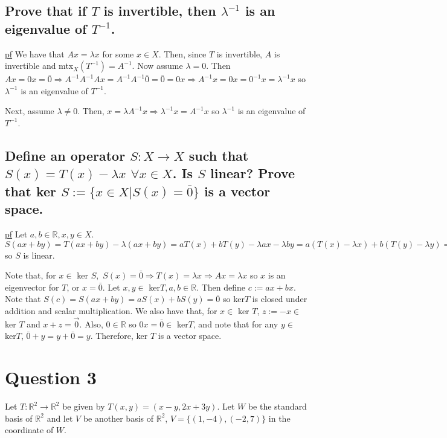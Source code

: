 \documentclass[11pt]{article} %
\begin{document}
\subsection{Prove that if $T$ is invertible, then $\lambda^{-1}$ is an eigenvalue of $T^{-1}$.}
\underline{pf} We have that $Ax = \lambda x$ for some $x \in X$. Then, since $T$ is invertible, $A$ is invertible and mtx$_X(T^{-1}) = A^{-1}.$ Now assume $\lambda = 0$. Then $Ax = 0x = \bar{0} \Rightarrow A^{-1} A^{-1} A x = A^{-1} A^{-1} \bar{0} = \bar{0} = 0x \Rightarrow A^{-1}x = 0 x = 0^{-1} x = \lambda^{-1} x$ so $\lambda^{-1}$ is an eigenvalue of $T^{-1}.$ 

Next, assume $\lambda \neq 0.$ Then, $x = \lambda A^{-1}x \Rightarrow \lambda^{-1} x = A^{-1}x$ so $\lambda^{-1}$ is an eigenvalue of $T^{-1}$.

\subsection{Define an operator $S: X \rightarrow X$ such that $S(x) = T(x) - \lambda x$ $\forall x \in X$. Is $S$ linear? Prove that ker $S:= \{ x \in X | S(x) = \bar{0}\}$ is a vector space.}
\underline{pf} Let $a,b \in \mathbb{R}, x,y \in X.$ $S(ax + by) = T(ax + by) - \lambda(ax+by) = aT(x) + bT(y) - \lambda a x - \lambda b y = a(T(x) - \lambda x) + b(T(y) - \lambda y) = aS(x) + bS(y)$ so $S$ is linear.

Note that, for $x \in $ ker $S,$ $S(x) = \bar{0} \Rightarrow T(x) = \lambda x \Rightarrow Ax = \lambda x$ so $x$ is an eigenvector for $T$, or $x = \bar{0}$. Let $x,y \in $ ker$T, a,b \in \mathbb{R}.$ Then define $c:= ax +bx.$ Note that $S(c) = S(ax+by) = aS(x)+bS(y) = \bar{0}$ so ker$T$ is closed under addition and scalar multiplication. We also have that, for $x \in $ ker $T$, $z := -x \in $ ker $T$ and $x+z = \vec{0}.$ Also, $0 \in \mathbb{R}$ so $0x = \bar{0} \in$ ker$T$, and note that for any $y \in $ ker$T$, $\bar{0} + y = y+\bar{0} = y.$  Therefore, ker $T$ is a vector space.


\section{Question 3}
Let $T: \mathbb{R}^2 \rightarrow \mathbb{R}^2$ be given by $T(x,y) = (x-y,2x+3y).$ Let $W$ be the standard basis of $\mathbb{R}^2$ and let $V$ be another basis of $\mathbb{R}^2$, $V = \{(1,-4),(-2,7) \}$ in the coordinate of $W$.
\end{document}
